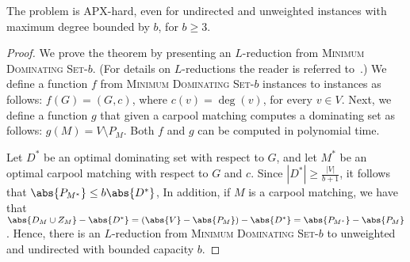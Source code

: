 \begin{theorem}
The \carpool problem is APX-hard, even for undirected and unweighted
instances with maximum degree bounded by $b$, for $b \geq 3$.
\end{theorem}
\begin{proof}
We prove the theorem by presenting an $L$-reduction from
\textsc{Minimum Dominating Set-$b$}.
(For details on $L$-reductions the reader is referred to~\cite{PapYan88}.)
%
We define a function $f$ from \textsc{Minimum Dominating Set-$b$}
instances to \carpool instances as follows: $f(G) = (G,c)$, where
$c(v) = \deg(v)$, for every $v \in V$.  Next, we define a function $g$
that given a carpool matching computes a dominating set as follows:
$g(M) = V \setminus P_{M}$.  Both $f$ and $g$ can be computed in
polynomial time.

Let $D^*$ be an optimal dominating set with respect to $G$, and let
$M^*$ be an optimal carpool matching with respect to $G$ and $c$.
Since $|D^*| \geq \frac{|V|}{b+1}$, it follows that 
\(
\abs{P_{M^*}} \leq b \abs{D^*}
\),
In addition, if $M$ is a carpool matching, we have that
\(
\abs{D_M \cup Z_M} - \abs{D^*}
= (\abs{V} - \abs{P_M}) - \abs{D^*}
= \abs{P_{M^*}} - \abs{P_M}
\).
Hence, there is an $L$-reduction from \textsc{Minimum Dominating
Set-$b$} to unweighted and undirected \carpool with bounded capacity
$b$.
\end{proof}
